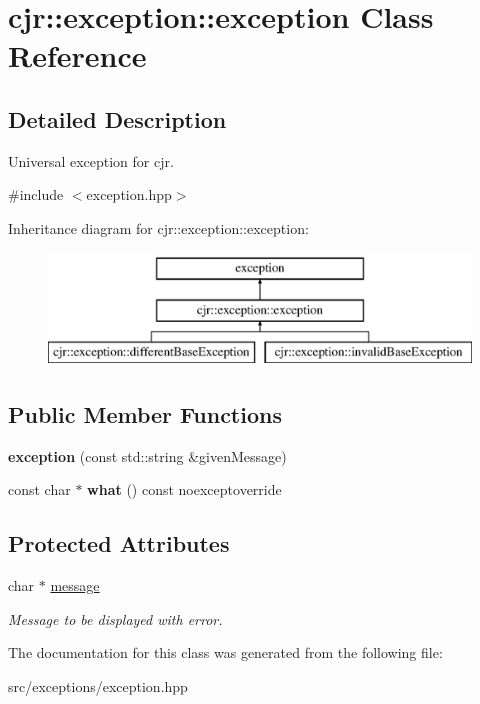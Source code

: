 \hypertarget{classcjr_1_1exception_1_1exception}{\section{cjr\-:\-:exception\-:\-:exception Class Reference}
\label{classcjr_1_1exception_1_1exception}
}


\subsection{Detailed Description}
Universal exception for cjr. 

{\ttfamily \#include $<$exception.\-hpp$>$}

Inheritance diagram for cjr\-:\-:exception\-:\-:exception\-:\begin{figure}[H]
\begin{center}
\leavevmode
\includegraphics[height=3.000000cm]{classcjr_1_1exception_1_1exception}
\end{center}
\end{figure}
\subsection*{Public Member Functions}
\begin{DoxyCompactItemize}
\item 
\hypertarget{classcjr_1_1exception_1_1exception_a7c359250e31f93a5f9fb20d4963cd029}{{\bfseries exception} (const std\-::string \&given\-Message)}\label{classcjr_1_1exception_1_1exception_a7c359250e31f93a5f9fb20d4963cd029}

\item 
\hypertarget{classcjr_1_1exception_1_1exception_a3a06a05cdfda3d492b5fa6a21c3dd177}{const char $\ast$ {\bfseries what} () const noexceptoverride}\label{classcjr_1_1exception_1_1exception_a3a06a05cdfda3d492b5fa6a21c3dd177}

\end{DoxyCompactItemize}
\subsection*{Protected Attributes}
\begin{DoxyCompactItemize}
\item 
\hypertarget{classcjr_1_1exception_1_1exception_a9197ebb57c1aae9af36848bb2bfb1886}{char $\ast$ \hyperlink{classcjr_1_1exception_1_1exception_a9197ebb57c1aae9af36848bb2bfb1886}{message}}\label{classcjr_1_1exception_1_1exception_a9197ebb57c1aae9af36848bb2bfb1886}

\begin{DoxyCompactList}\small\item\em Message to be displayed with error. \end{DoxyCompactList}\end{DoxyCompactItemize}


The documentation for this class was generated from the following file\-:\begin{DoxyCompactItemize}
\item 
src/exceptions/exception.\-hpp\end{DoxyCompactItemize}
